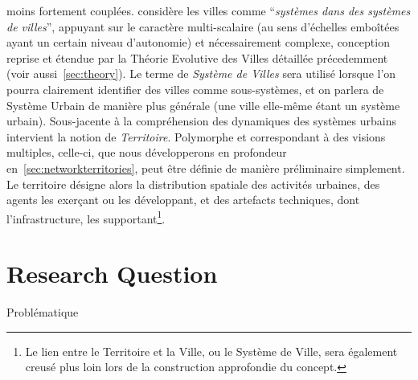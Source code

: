 {moins fortement couplées. \cite{berry1964cities} considère les villes comme ``\textit{systèmes dans des systèmes de villes}'', appuyant sur le caractère multi-scalaire (au sens d'échelles emboîtées ayant un certain niveau d'autonomie) et nécessairement complexe, conception reprise et étendue par la Théorie Evolutive des Villes détaillée précedemment (voir aussi~\ref{sec:theory}). Le terme de \emph{Système de Villes} sera utilisé lorsque l'on pourra clairement identifier des villes comme sous-systèmes, et on parlera de Système Urbain de manière plus générale (une ville elle-même étant un système urbain). Sous-jacente à la compréhension des dynamiques des systèmes urbains intervient la notion de \emph{Territoire}. Polymorphe et correspondant à des visions multiples, celle-ci, que nous développerons en profondeur en~\ref{sec:networkterritories}, peut être définie de manière préliminaire simplement. Le territoire désigne alors la distribution spatiale des activités urbaines, des agents les exerçant ou les développant, et des artefacts techniques, dont l'infrastructure, les supportant\footnote{Le lien entre le Territoire et la Ville, ou le Système de Ville, sera également creusé plus loin lors de la construction approfondie du concept.}.
}


\section*{Research Question}{Problématique}




